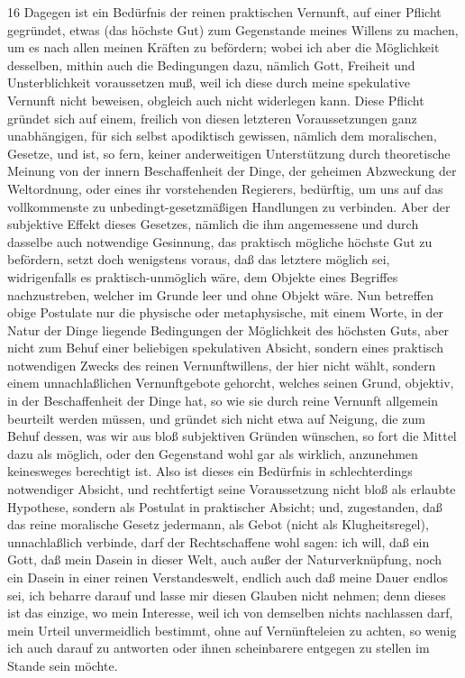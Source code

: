 \documentclass[a4paper,12pt,twoside]{book}
\begin{document}
	
	16
	Dagegen ist ein Bedürfnis der reinen praktischen Vernunft, auf einer Pflicht gegründet, etwas (das höchste Gut) zum Gegenstande meines Willens zu machen, um es nach allen meinen Kräften zu befördern; wobei ich aber die Möglichkeit desselben, mithin auch die Bedingungen dazu, nämlich Gott, Freiheit und Unsterblichkeit voraussetzen muß, weil  ich diese durch meine spekulative Vernunft nicht beweisen, obgleich auch nicht widerlegen kann. Diese Pflicht gründet sich auf einem, freilich von diesen letzteren Voraussetzungen ganz unabhängigen, für sich selbst apodiktisch gewissen, nämlich dem moralischen, Gesetze, und ist, so fern, keiner anderweitigen Unterstützung durch theoretische Meinung von der innern Beschaffenheit der Dinge, der geheimen Abzweckung der Weltordnung, oder eines ihr vorstehenden Regierers, bedürftig, um uns auf das vollkommenste zu unbedingt-gesetzmäßigen Handlungen zu verbinden. Aber der subjektive Effekt dieses Gesetzes, nämlich die ihm angemessene und durch dasselbe auch notwendige Gesinnung, das praktisch mögliche höchste Gut zu befördern, setzt doch wenigstens voraus, daß das letztere möglich sei, widrigenfalls es praktisch-unmöglich wäre, dem Objekte eines Begriffes nachzustreben, welcher im Grunde leer und ohne Objekt wäre. Nun betreffen obige Postulate nur die physische oder metaphysische, mit einem Worte, in der Natur der Dinge liegende Bedingungen der Möglichkeit des höchsten Guts, aber nicht zum Behuf einer beliebigen spekulativen Absicht, sondern eines praktisch notwendigen Zwecks des reinen Vernunftwillens, der hier nicht wählt, sondern einem unnachlaßlichen Vernunftgebote gehorcht, welches seinen Grund, objektiv, in der Beschaffenheit der Dinge hat, so wie sie durch reine Vernunft allgemein beurteilt werden müssen, und gründet sich nicht etwa auf Neigung, die zum Behuf dessen, was wir aus bloß subjektiven Gründen wünschen, so fort die Mittel dazu als möglich, oder den Gegenstand wohl gar als wirklich, anzunehmen keinesweges berechtigt ist. Also ist dieses ein Bedürfnis in schlechterdings notwendiger Absicht, und rechtfertigt seine Voraussetzung nicht bloß als erlaubte Hypothese, sondern als Postulat in praktischer Absicht; und, zugestanden, daß das reine moralische Gesetz jedermann, als Gebot (nicht als Klugheitsregel), unnachlaßlich verbinde, darf der Rechtschaffene wohl sagen: ich will, daß ein Gott, daß mein Dasein in dieser Welt, auch außer der Naturverknüpfung, noch ein Dasein in einer reinen Verstandeswelt,  endlich auch daß meine Dauer endlos sei, ich beharre darauf und lasse mir diesen Glauben nicht nehmen; denn dieses ist das einzige, wo mein Interesse, weil ich von demselben nichts nachlassen darf, mein Urteil unvermeidlich bestimmt, ohne auf Vernünfteleien zu achten, so wenig ich auch darauf zu antworten oder ihnen scheinbarere entgegen zu stellen im Stande sein möchte.
	
\end{document}
